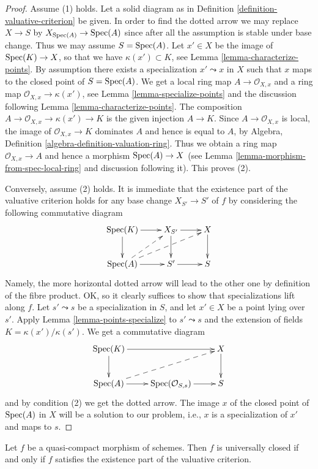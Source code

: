 \begin{proof}
Assume (1) holds. Let a solid diagram as in
Definition \ref{definition-valuative-criterion} be given.
In order to find the dotted arrow we may replace $X \to S$
by $X_{\mathop{\mathrm{Spec}}(A)} \to \mathop{\mathrm{Spec}}(A)$ since after all
the assumption is stable under base change.
Thus we may assume $S = \mathop{\mathrm{Spec}}(A)$.
Let $x' \in X$ be the image of $\mathop{\mathrm{Spec}}(K) \to X$, so
that we have $\kappa(x') \subset K$, see
Lemma \ref{lemma-characterize-points}.
By assumption there exists a specialization $x' \leadsto x$
in $X$ such that $x$ maps to the closed point of $S = \mathop{\mathrm{Spec}}(A)$.
We get a local ring map $A \to \mathcal{O}_{X, x}$ and a ring
map $\mathcal{O}_{X, x} \to \kappa(x')$, see
Lemma \ref{lemma-specialize-points} and the discussion following
Lemma \ref{lemma-characterize-points}. The composition
$A \to \mathcal{O}_{X, x} \to \kappa(x') \to K$ is the
given injection $A \to K$. Since $A \to \mathcal{O}_{X, x}$
is local, the image of $\mathcal{O}_{X, x} \to K$
dominates $A$ and hence is equal to $A$, by
Algebra, Definition \ref{algebra-definition-valuation-ring}.
Thus we obtain a ring map $\mathcal{O}_{X, x} \to A$ and
hence a morphism $\mathop{\mathrm{Spec}}(A) \to X$
(see Lemma \ref{lemma-morphism-from-spec-local-ring} and
discussion following it). This proves (2).

\medskip\noindent
Conversely, assume (2) holds. It is immediate that
the existence part of the valuative criterion holds for
any base change $X_{S'} \to S'$ of $f$ by considering
the following commutative diagram
$$
\xymatrix{
\Spec(K) \ar[r] \ar[d] & X_{S'} \ar[r] \ar[d] & X \ar[d] \\
\Spec(A) \ar[r] \ar@{-->}[ru] \ar@{-->}[rru] & S' \ar[r] & S
}
$$
Namely, the more horizontal dotted arrow will lead to the
other one by definition of the fibre product. OK, so it clearly
suffices to show that specializations lift along $f$.
Let $s' \leadsto s$ be a specialization in $S$, and let
$x' \in X$ be a point lying over $s'$. Apply
Lemma \ref{lemma-points-specialize}
to $s' \leadsto s$ and the extension of fields
$K = \kappa(x')/\kappa(s')$.
We get a commutative diagram
$$
\xymatrix{
\Spec(K) \ar[rr] \ar[d] & & X \ar[d] \\
\Spec(A) \ar[r] \ar@{-->}[rru] &
\Spec(\mathcal{O}_{S, s}) \ar[r] & S
}
$$
and by condition (2) we get the dotted arrow.
The image $x$ of the closed point of $\mathop{\mathrm{Spec}}(A)$
in $X$ will be a solution to our problem, i.e.,
$x$ is a specialization of $x'$ and maps to $s$.
\end{proof}

\begin{proposition}
\label{proposition-characterize-universally-closed}
Let $f$ be a quasi-compact morphism of schemes.
Then $f$ is universally closed if and only if $f$
satisfies the existence part of the valuative criterion.
\end{proposition}

